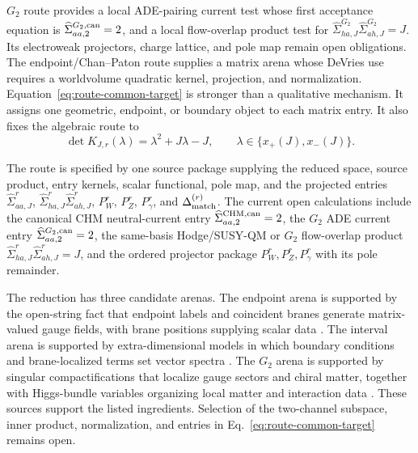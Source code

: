 \(G_2\) route provides a local ADE-pairing current test whose first acceptance
equation is \(\widehat\Sigma_{aa,2}^{G_2,{\rm can}}=2\), and a local
flow-overlap product test for
\(\widehat\Sigma_{ha,J}^{G_2}\widehat\Sigma_{ah,J}^{G_2}=J\).  Its
electroweak projectors, charge lattice, and pole map remain open obligations.  The
endpoint/Chan--Paton route
supplies a matrix arena whose DeVries use requires a worldvolume quadratic
kernel, projection, and normalization.
Equation~\eqref{eq:route-common-target} is stronger than a qualitative mechanism.  It assigns one geometric, endpoint, or boundary object to each matrix entry.  It also fixes the algebraic route to
\begin{equation}
  \det K_{J,r}(\lambda)=\lambda^2+J\lambda-J,
  \qquad
  \lambda\in\{x_+(J),x_-(J)\}.
  \label{eq:route-common-det}
\end{equation}

The route is specified by one source package supplying the reduced space,
source product, entry kernels, scalar functional, pole map, and the projected
entries \(\widehat\Sigma_{aa,J}^r\),
\(\widehat\Sigma_{ha,J}^r\widehat\Sigma_{ah,J}^r\),
\(P_W^r\), \(P_Z^r\), \(P_\gamma^r\), and
\(\Delta_{\rm match}^{(r)}\).  The current open calculations include the
canonical CHM neutral-current entry
\(\widehat\Sigma_{aa,2}^{\rm CHM,can}=2\), the \(G_2\) ADE current entry
\(\widehat\Sigma_{aa,2}^{G_2,{\rm can}}=2\), the same-basis Hodge/SUSY-QM or
\(G_2\) flow-overlap product
\(\widehat\Sigma_{ha,J}^r\widehat\Sigma_{ah,J}^r=J\), and the ordered
projector package \(P_W^r,P_Z^r,P_\gamma^r\) with its pole remainder.

The reduction has three candidate arenas.  The endpoint arena is supported by the open-string fact that endpoint labels and coincident branes generate matrix-valued gauge fields, with brane positions supplying scalar data \cite{TongString,Polchinski1994}.  The interval arena is supported by extra-dimensional models in which boundary conditions and brane-localized terms set vector spectra \cite{CsakiHubiszMeade2005}.  The \(G_2\) arena is supported by singular compactifications that localize gauge sectors and chiral matter, together with Higgs-bundle variables organizing local matter and interaction data \cite{WittenG2Anomaly2001,AcharyaWitten2001,AcharyaGukov2004,BraunEtAl2019}.  These sources support the listed ingredients.  Selection of the two-channel subspace, inner product, normalization, and entries in Eq.~\eqref{eq:route-common-target} remains open.

